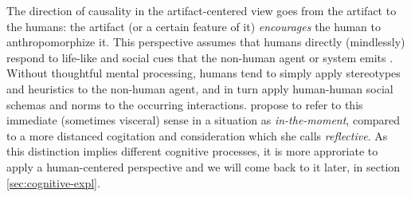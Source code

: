 \documentclass{frontiersSCNS} %
\begin{document}
The direction of causality in the artifact-centered view goes from the artifact
to the humans: the artifact (or a certain feature of it) \emph{encourages} the
human to anthropomorphize it.  This perspective assumes that humans directly
(mindlessly) respond to life-like and social cues that the non-human agent or
system emits \citep{nass_machines_2000}. Without thoughtful mental processing,
humans tend to simply apply stereotypes and heuristics to the non-human agent,
and in turn apply human-human social schemas and norms to the occurring
interactions.  \cite{takayama_perspectives_2012} propose to refer to this
immediate (sometimes visceral) sense in a situation as \textit{in-the-moment},
compared to a more distanced cogitation and consideration which she calls
\textit{reflective}. As this distinction implies different cognitive processes,
it is more approriate to apply a human-centered perspective and we will come
back to it later, in section \ref{sec:cognitive-expl}.

%
%

 
\end{document}
